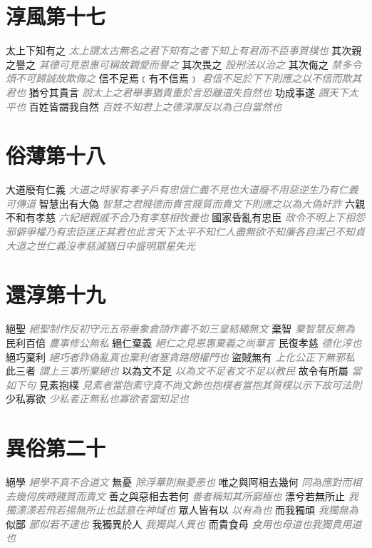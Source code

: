 \documentclass[a4paper,zihao=-4,oneside,landscape,UTF8]{ctexart}
\newcommand{\zhushi}[1]{\scriptsize{\textit{\textcolor{gray}{#1}}}\normalsize}
\begin{document}
\section{淳風第十七}

太上下知有之
\zhushi{太上謂太古無名之君下知有之者下知上有君而不臣事質樸也}
其次親之譽之
\zhushi{其德可見恩惠可稱故親愛而譽之}
其次畏之
\zhushi{設刑法以治之}
其次侮之
\zhushi{禁多令煩不可歸誠故欺侮之}
信不足焉﹝有不信焉﹞
\zhushi{君信不足於下下則應之以不信而欺其君也}
猶兮其貴言
\zhushi{說太上之君舉事猶貴重於言恐離道失自然也}
功成事遂
\zhushi{謂天下太平也}
百姓皆謂我自然
\zhushi{百姓不知君上之德淳厚反以為己自當然也}


\section{俗薄第十八}

大道廢有仁義
\zhushi{大道之時家有孝子戶有忠信仁義不見也大道廢不用惡逆生乃有仁義可傳道}
智慧出有大偽
\zhushi{智慧之君賤德而貴言賤質而貴文下則應之以為大偽奸詐}
六親不和有孝慈
\zhushi{六紀絕親戚不合乃有孝慈相牧養也}
國家昏亂有忠臣
\zhushi{政令不明上下相怨邪僻爭權乃有忠臣匡正其君也此言天下太平不知仁人盡無欲不知廉各自潔己不知貞大道之世仁義沒孝慈滅猶日中盛明眾星失光}


\section{還淳第十九}

絕聖
\zhushi{絕聖制作反初守元五帝垂象倉頡作書不如三皇結繩無文}
棄智
\zhushi{棄智慧反無為}
民利百倍
\zhushi{農事修公無私}
絕仁棄義
\zhushi{絕仁之見恩惠棄義之尚華言}
民復孝慈
\zhushi{德化淳也}
絕巧棄利
\zhushi{絕巧者詐偽亂真也棄利者塞貪路閉權門也}
盜賊無有
\zhushi{上化公正下無邪私}
此三者
\zhushi{謂上三事所棄絕也}
以為文不足
\zhushi{以為文不足者文不足以教民}
故令有所屬
\zhushi{當如下句}
見素抱樸
\zhushi{見素者當抱素守真不尚文飾也抱樸者當抱其質樸以示下故可法則}
少私寡欲
\zhushi{少私者正無私也寡欲者當知足也}


\section{異俗第二十}

絕學
\zhushi{絕學不真不合道文}
無憂
\zhushi{除浮華則無憂患也}
唯之與阿相去幾何
\zhushi{同為應對而相去幾何疾時賤質而貴文}
善之與惡相去若何
\zhushi{善者稱知其所窮極也}
漂兮若無所止
\zhushi{我獨漂漂若飛若揚無所止也誌意在神域也}
眾人皆有以
\zhushi{以有為也}
而我獨頑
\zhushi{我獨無為}
似鄙
\zhushi{鄙似若不逮也}
我獨異於人
\zhushi{我獨與人異也}
而貴食母
\zhushi{食用也母道也我獨貴用道也}
\end{document}
